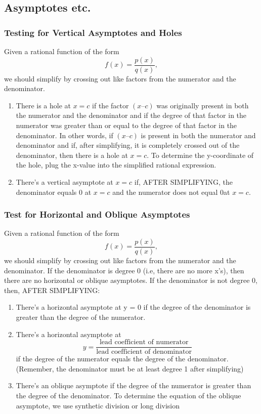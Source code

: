 \documentclass{article}
\begin{document}
\newpage
\subsection{Asymptotes etc.}
\subsubsection{Testing for Vertical Asymptotes and Holes} 
Given a rational function of the form $$f(x)=\frac{p(x)}{q(x)},$$ we should simplify by crossing out like factors from the numerator and the denominator. 
\begin{enumerate}
    \item There is a hole at $x = c$ if the factor $(x –c)$ was originally present in both the numerator and the denominator and if the degree of that factor in the numerator was greater than or equal to the degree of that factor in the denominator. In other words, if $(x –c)$ is present in both the numerator and denominator and if, after simplifying, it is completely crossed out of the denominator, then there is a hole at  $x = c$. To determine the y-coordinate of the hole, plug the x-value into the simplified rational expression.
    \item There’s a vertical asymptote at $x = c$ if, AFTER SIMPLIFYING, the denominator equals 0 at $x = c$ and the numerator does not equal 0at $x = c$.
\end{enumerate}

\subsubsection{Test for Horizontal and Oblique Asymptotes}
Given a rational function of the form $$f(x)=\frac{p(x)}{q(x)},$$ we should simplify by crossing out like factors from the numerator and the denominator. If the denominator is degree 0 (i.e, there are no more x’s), then there are no horizontal or oblique asymptotes. If the denominator is not degree 0, then, AFTER SIMPLIFYING:
\begin{enumerate}
    \item There’s a horizontal asymptote at y = 0 if the degree of the denominator is greater than the degree of the numerator.
    \item There’s a horizontal asymptote at $$y=\frac{\text{lead coefficient of numerator}}{\text{lead coefficient of denominator}}$$ if the degree of the numerator equals the degree of the denominator. (Remember, the denominator must be at least degree 1 after simplifying)
    \item There’s an oblique asymptote if the degree of the numerator is greater than the degree of the denominator.  To determine the equation of the oblique asymptote, we use synthetic division or long division
\end{enumerate}
\end{document}
